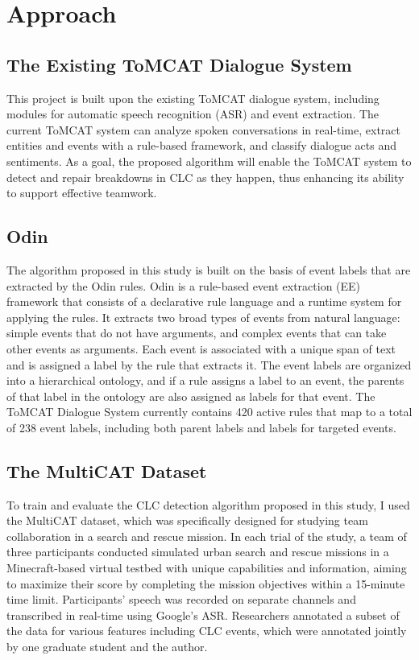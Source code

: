 \documentclass[11pt]{article}
\begin{document}
\section{Approach}
\subsection{The Existing ToMCAT Dialogue System}
This project is built upon the existing ToMCAT dialogue system, including modules for automatic speech recognition (ASR) and event extraction. The current ToMCAT system can analyze spoken conversations in real-time, extract entities and events with a rule-based framework, and classify dialogue acts and sentiments. As a goal, the proposed algorithm will enable the ToMCAT system to detect and repair breakdowns in CLC as they happen, thus enhancing its ability to support effective teamwork. 
\subsection{Odin}
The algorithm proposed in this study is built on the basis of event labels that are extracted by the Odin rules. Odin is a rule-based event extraction (EE) framework that consists of a declarative rule language and a runtime system for applying the rules. It extracts two broad types of events from natural language: simple events that do not have arguments, and complex events that can take other events as arguments. Each event is associated with a unique span of text and is assigned a label by the rule that extracts it. The event labels are organized into a hierarchical ontology, and if a rule assigns a label to an event, the parents of that label in the ontology are also assigned as labels for that event. The ToMCAT Dialogue System currently contains 420 active rules that map to a total of 238 event labels, including both parent labels and labels for targeted events. 

\subsection{The MultiCAT Dataset}
To train and evaluate the CLC detection algorithm proposed in this study, I used the MultiCAT dataset, which was specifically designed for studying team collaboration in a search and rescue mission. In each trial of the study, a team of three participants conducted simulated urban search and rescue missions in a Minecraft-based virtual testbed with unique capabilities and information, aiming to maximize their score by completing the mission objectives within a 15-minute time limit. Participants' speech was recorded on separate channels and transcribed in real-time using Google's ASR. Researchers annotated a subset of the data for various features including CLC events, which were annotated jointly by one graduate student and the author.
\end{document}
